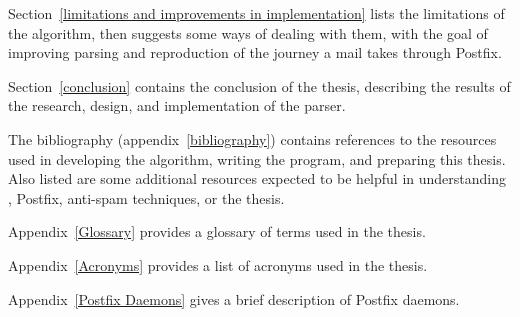 Section~\ref{limitations and improvements in implementation} lists the
limitations of the algorithm, then suggests some ways of dealing with them,
with the goal of improving parsing and reproduction of the journey a mail
takes through Postfix.

Section~\ref{conclusion} contains the conclusion of the thesis, describing
the results of the research, design, and implementation of the parser.

The bibliography (appendix~\ref{bibliography}) contains references to the
resources used in developing the algorithm, writing the program, and
preparing this thesis.  Also listed are some additional resources expected
to be helpful in understanding , Postfix, anti-spam
techniques, or the thesis.

Appendix~\ref{Glossary} provides a glossary of terms used in the thesis.

Appendix~\ref{Acronyms} provides a list of acronyms used in the thesis.

Appendix~\ref{Postfix Daemons} gives a brief description of Postfix
daemons.

